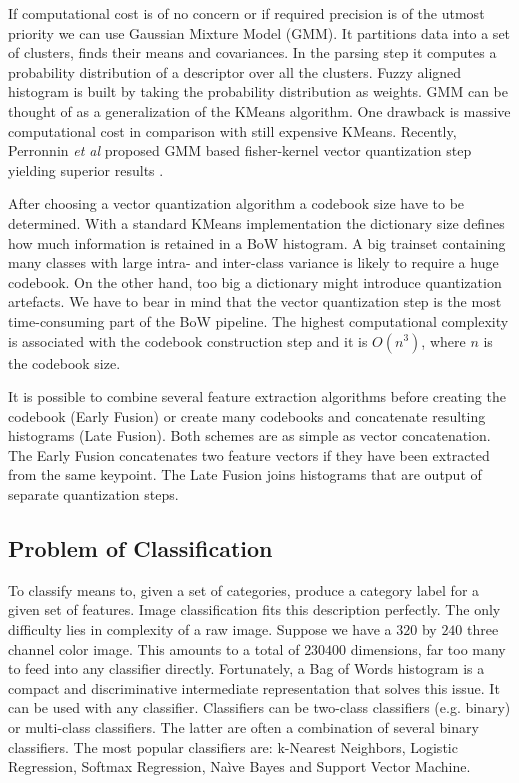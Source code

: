 \documentclass[12pt]{article}
\begin{document}
    If computational cost is of no concern or if required precision is of the 
utmost priority we can use Gaussian Mixture Model (GMM). It partitions data 
into a set of clusters, finds their means and covariances. In the parsing step 
it computes a probability distribution of a descriptor over all the clusters. 
Fuzzy aligned histogram is built by taking the probability distribution as 
weights. GMM can be thought of as a generalization of the KMeans algorithm. One 
drawback is massive computational cost in comparison with still expensive 
KMeans. Recently, Perronnin \textit{et al} proposed GMM based fisher-kernel 
vector quantization step yielding superior results \cite{fisher1, fisher2}.	
	
    After choosing a vector quantization algorithm a codebook size have to be 
determined. With a standard KMeans implementation the dictionary size defines 
how much information is retained in a BoW histogram. A big trainset containing 
many classes with large intra- and inter-class variance is likely to 
require a huge codebook. On the other hand, too big a dictionary might 
introduce quantization artefacts. We have to bear in mind that the vector 
quantization step is the most time-consuming part of the BoW pipeline. The 
highest computational complexity is associated with the codebook construction 
step and it is $O(n^3)$, where $n$ is the codebook size.		
    
    It is possible to combine several feature extraction algorithms before 
creating the codebook (Early Fusion) or create many codebooks and concatenate 
resulting histograms (Late Fusion). Both schemes are as simple as vector 
concatenation. The Early Fusion concatenates two feature vectors if they have 
been extracted from the same keypoint. The Late Fusion joins histograms that 
are output of separate quantization steps.
	      
\subsection{Problem of Classification}

    To classify means to, given a set of categories, produce a category label 
for a given set of features. Image classification fits this 
description perfectly. The only difficulty lies in complexity of a raw image. 
Suppose we have a $320$ by $240$ three channel color image. This amounts to a 
total of $230400$ dimensions, far too many to feed into any classifier 
directly. Fortunately, a Bag of Words histogram is a compact and discriminative 
intermediate representation that solves this issue. It can be used with any 
classifier. Classifiers can be two-class classifiers (e.g. binary) or 
multi-class classifiers. The latter are often a combination of several binary 
classifiers. The most popular classifiers are: k-Nearest Neighbors, Logistic 
Regression, Softmax Regression, Na\`ive Bayes and Support Vector Machine.
\end{document}
